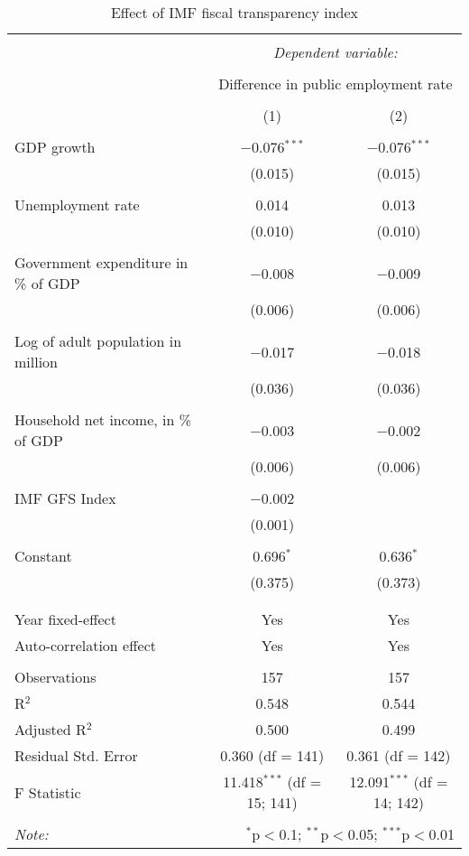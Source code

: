 
\begin{table}[!htbp] \centering 
  \caption{Effect of IMF fiscal transparency index} 
  \label{} 
\begin{tabular}{@{\extracolsep{5pt}}lcc} 
\\[-1.8ex]\hline 
\hline \\[-1.8ex] 
 & \multicolumn{2}{c}{\textit{Dependent variable:}} \\ 
\cline{2-3} 
\\[-1.8ex] & \multicolumn{2}{c}{Difference in public employment rate} \\ 
\\[-1.8ex] & (1) & (2)\\ 
\hline \\[-1.8ex] 
 GDP growth & $-$0.076$^{***}$ & $-$0.076$^{***}$ \\ 
  & (0.015) & (0.015) \\ 
  & & \\ 
 Unemployment rate & 0.014 & 0.013 \\ 
  & (0.010) & (0.010) \\ 
  & & \\ 
 Government expenditure in \% of GDP & $-$0.008 & $-$0.009 \\ 
  & (0.006) & (0.006) \\ 
  & & \\ 
 Log of adult population in million & $-$0.017 & $-$0.018 \\ 
  & (0.036) & (0.036) \\ 
  & & \\ 
 Household net income, in \% of GDP & $-$0.003 & $-$0.002 \\ 
  & (0.006) & (0.006) \\ 
  & & \\ 
 IMF GFS Index & $-$0.002 &  \\ 
  & (0.001) &  \\ 
  & & \\ 
 Constant & 0.696$^{*}$ & 0.636$^{*}$ \\ 
  & (0.375) & (0.373) \\ 
  & & \\ 
\hline \\[-1.8ex] 
Year fixed-effect & Yes & Yes \\ 
Auto-correlation effect & Yes & Yes \\ 
\hline \\[-1.8ex] 
Observations & 157 & 157 \\ 
R$^{2}$ & 0.548 & 0.544 \\ 
Adjusted R$^{2}$ & 0.500 & 0.499 \\ 
Residual Std. Error & 0.360 (df = 141) & 0.361 (df = 142) \\ 
F Statistic & 11.418$^{***}$ (df = 15; 141) & 12.091$^{***}$ (df = 14; 142) \\ 
\hline 
\hline \\[-1.8ex] 
\textit{Note:}  & \multicolumn{2}{r}{$^{*}$p$<$0.1; $^{**}$p$<$0.05; $^{***}$p$<$0.01} \\ 
\end{tabular} 
\end{table} 
